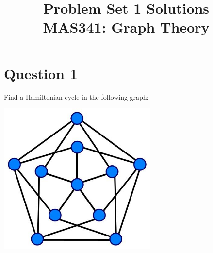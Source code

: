 \documentclass{amsart}
\title{Problem Set 1 Solutions \\ MAS341: Graph Theory }
\begin{document}
\maketitle
\section{Question 1}
Find a Hamiltonian cycle in the following graph:

\begin{center}
\includegraphics[width=8cm]{ProblemSet1Graph1.jpg}
\end{center}
\end{document}
